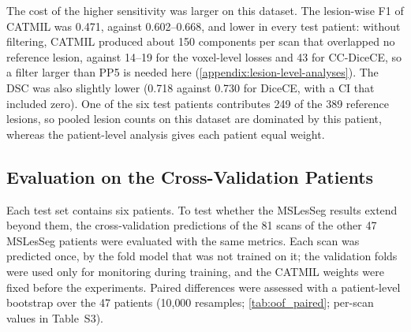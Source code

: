 The cost of the higher sensitivity was larger on this dataset. The
lesion-wise F1 of CATMIL was 0.471, against 0.602--0.668, and lower in every
test patient: without filtering, CATMIL produced about 150 components per
scan that overlapped no reference lesion, against 14--19 for the
voxel-level losses and 43 for CC-DiceCE, so a filter larger than PP5 is
needed here (\cref{appendix:lesion-level-analyses}). The DSC was also
slightly lower (0.718 against 0.730 for DiceCE, with a CI that included
zero). One of the six test patients contributes 249 of the 389 reference
lesions, so pooled lesion counts on this dataset are dominated by this
patient, whereas the patient-level analysis gives each patient equal
weight.

\subsection{Evaluation on the Cross-Validation Patients}
\label{sec:catmil_oof}

Each test set contains six patients. To test whether the MSLesSeg results
extend beyond them, the cross-validation predictions of the 81 scans of the
other 47 MSLesSeg patients were evaluated with the same metrics. Each scan
was predicted once, by the fold model that was not trained on it; the
validation folds were used only for monitoring during training, and the
CATMIL weights were fixed before the experiments. Paired differences were
assessed with a patient-level bootstrap over the 47 patients (10{,}000
resamples; \cref{tab:oof_paired}; per-scan values in Table~S3).


